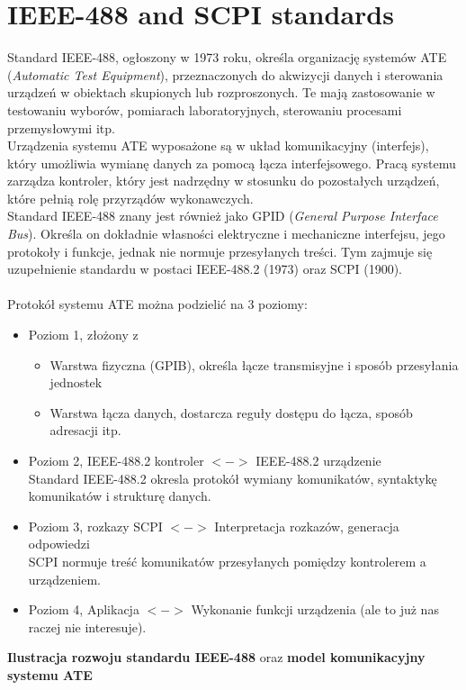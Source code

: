 \newcommand\XOR{\mathbin{\char`\^}}

\section{IEEE-488 and SCPI standards}
Standard IEEE-488, ogłoszony w 1973 roku, określa organizację systemów ATE (\emph{Automatic Test Equipment}), przeznaczonych do akwizycji danych i sterowania urządzeń w obiektach skupionych lub rozproszonych. Te mają zastosowanie w testowaniu wyborów, pomiarach laboratoryjnych, sterowaniu procesami przemysłowymi itp.\\
Urządzenia systemu ATE wyposażone są w układ komunikacyjny (interfejs), który umożliwia wymianę danych za pomocą łącza interfejsowego. Pracą systemu zarządza kontroler, który jest nadrzędny w stosunku do pozostałych urządzeń, które pełnią rolę przyrządów wykonawczych.\\
Standard IEEE-488 znany jest również jako GPID (\emph{General Purpose Interface Bus}). Określa on dokładnie własności elektryczne i mechaniczne interfejsu, jego protokoły i funkcje, jednak nie normuje przesyłanych treści. Tym zajmuje się uzupełnienie standardu w postaci IEEE-488.2 (1973) oraz SCPI (1900).\\\\
Protokół systemu ATE można podzielić na 3 poziomy:
\begin{itemize}
	\item Poziom 1, złożony z
	\begin{itemize}
		\item Warstwa fizyczna (GPIB), określa łącze transmisyjne i sposób przesyłania jednostek
		\item Warstwa łącza danych, dostarcza reguły dostępu do łącza, sposób adresacji itp.
	\end{itemize}
	\item Poziom 2, IEEE-488.2 kontroler $<->$ IEEE-488.2 urządzenie\\
	Standard IEEE-488.2 okresla protokół wymiany komunikatów, syntaktykę komunikatów i strukturę danych.
	\item Poziom 3, rozkazy SCPI $<->$ Interpretacja rozkazów, generacja odpowiedzi\\
	SCPI normuje treść komunikatów przesyłanych pomiędzy kontrolerem a urządzeniem.
	\item Poziom 4, Aplikacja $<->$ Wykonanie funkcji urządzenia (ale to już nas raczej nie interesuje).
\end{itemize}
\textbf{Ilustracja rozwoju standardu IEEE-488} oraz \textbf{model komunikacyjny systemu ATE}\\
